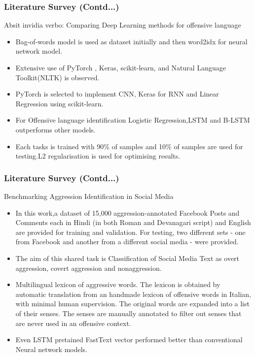 \documentclass{beamer}
\begin{document}
\begin{frame}\frametitle{Literature Survey (Contd...)}
      Absit invidia verbo: Comparing Deep Learning methods for offensive language\cite{comparingDeepLearning}
	
	\begin{itemize}
		\item Bag-of-words model is used as dataset initially and then word2idx for neural network model. 
		\item Extensive use of PyTorch , Keras, scikit-learn, and Natural Language Toolkit(NLTK) is observed.
		\item PyTorch is selected to implement CNN, Keras for RNN and Linear Regression using scikit-learn.
		\item For Offensive language identification Logistic Regression,LSTM and B-LSTM outperforms other models.
	    \item Each tasks is trained with 90\% of samples and 10\% of samples are used for testing.L2 regularisation is used for optimising results.
	\end{itemize}
\end{frame}

\begin{frame}\frametitle{Literature Survey (Contd...)}
Benchmarking Aggression Identification in Social Media\cite{benchmarkAggressionIden}

\begin{itemize}
	\item In this work,a dataset of 15,000 aggression-annotated Facebook Posts and Comments each in Hindi (in both Roman and Devanagari script) and English are provided for training and validation. For testing, two different sets - one from Facebook and another from a different social media - were provided.
	\item The aim of this shared task is Classification of Social Media Text as overt aggression, covert aggression and nonaggression.
	\item Multilingual lexicon of aggressive words. The lexicon is obtained by automatic translation from an handmade lexicon of offensive words in Italian, with minimal human supervision. The original words are expanded into a list of their senses. The senses are manually annotated to filter out senses that are never used in an offensive context.
	\item Even LSTM pretained FastText vector performed better than conventional Neural network models.
\end{itemize}
\end{frame}
\end{document}
